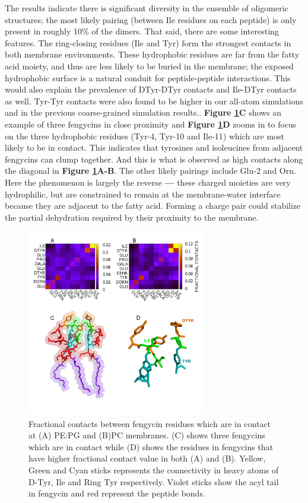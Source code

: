 The results indicate there is significant diversity in the ensemble of
oligomeric structures; the most likely pairing (between Ile residues on each
peptide) is only present in roughly 10\% of the dimers.  That said, there are
some interesting features.  The ring-closing residues (Ile and Tyr) form the
strongest contacts in both membrane environments. These hydrophobic residues are
far from the fatty acid moiety, and thus are less likely to be buried in the
membrane; the exposed hydrophobic surface is a natural conduit for
peptide-peptide interactions. This would also explain the prevalence of
DTyr-DTyr contacts and Ile-DTyr contacts as well. Tyr-Tyr contacts were also
found to be higher in our all-atom simulations and in the previous
coarse-grained simulation results.\cite{Grossfield2013}.
\textbf{Figure \ref{fig:ch2_amino_contacts}C} shows an example of three fengycins in close
proximity and \textbf{Figure \ref{fig:ch2_amino_contacts}D} zooms in to focus on the
three hydrophobic residues (Tyr-4, Tyr-10 and Ile-11) which are most likely to be in contact.
 This indicates that tyrosines and isoleucines from
adjacent fengycins can clump together.
 And this is what is observed as high contacts along the diagonal in \textbf{Figure \ref{fig:ch2_amino_contacts}A-B}.
The other likely pairings include Glu-2 and Orn. Here the phenomenon is
largely the reverse \textbf{---} these charged moieties are very hydrophilic, but
are constrained to remain at the membrane-water interface because they
are adjacent to the fatty acid. Forming a charge pair could stabilize the partial dehydration required by their proximity to the membrane.

\begin{figure}
\centering
\includegraphics[width=0.7\textwidth]{chapter2_figs/paper_amino_svg.png}
\caption{\label{fig:ch2_amino_contacts}Fractional contacts between fengycin residues which are in contact at (A) PE:PG and (B)PC membranes.
(C) shows three fengycins which are in contact while (D) shows the residues in fengycins that have higher fractional contact value in both
(A) and (B). Yellow, Green and Cyan sticks represents the connectivity in heavy atoms of D-Tyr, Ile and Ring Tyr respectively. Violet
sticks show the acyl tail in fengycin and red represent the peptide bonds.}
\end{figure}

